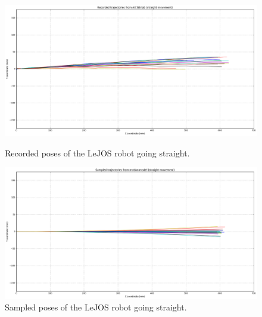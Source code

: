 \documentclass[paper=a4, fontsize=11pt]{scrartcl} %
\begin{document}
    \begin{figure}[H]
        \centering
        \begin{minipage}{\textwidth}
            \centering
            \includegraphics[width=1\textwidth]{images/recorded_poses_straight.png} %
            \caption{Recorded poses of the LeJOS robot going straight.}
        \end{minipage}\hfill
        \begin{minipage}{\textwidth}
            \centering
            \includegraphics[width=1\textwidth]{images/sampled_poses_straight.png} %
            \caption{Sampled poses of the LeJOS robot going straight.}
        \end{minipage}
    \end{figure}
\end{document}

